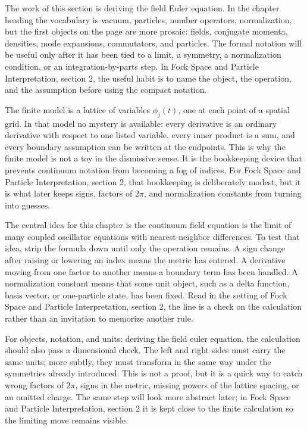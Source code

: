 The work of this section is deriving the field Euler equation.  In the chapter heading the vocabulary is vacuum, particles, number operators, normalization, but the first objects on the page are more prosaic: fields, conjugate momenta, densities, mode expansions, commutators, and particles.  The formal notation will be useful only after it has been tied to a limit, a symmetry, a normalization condition, or an integration-by-parts step.  In Fock Space and Particle Interpretation, section 2, the useful habit is to name the object, the operation, and the assumption before using the compact notation.

The finite model is a lattice of variables \(\phi_j(t)\), one at each point of a spatial grid.  In that model no mystery is available: every derivative is an ordinary derivative with respect to one listed variable, every inner product is a sum, and every boundary assumption can be written at the endpoints.  This is why the finite model is not a toy in the dismissive sense.  It is the bookkeeping device that prevents continuum notation from becoming a fog of indices.  For Fock Space and Particle Interpretation, section 2, that bookkeeping is deliberately modest, but it is what later keeps signs, factors of \(2\pi\), and normalization constants from turning into guesses.

The central idea for this chapter is the continuum field equation is the limit of many coupled oscillator equations with nearest-neighbor differences.  To test that idea, strip the formula down until only the operation remains.  A sign change after raising or lowering an index means the metric has entered.  A derivative moving from one factor to another means a boundary term has been handled.  A normalization constant means that some unit object, such as a delta function, basis vector, or one-particle state, has been fixed.  Read in the setting of Fock Space and Particle Interpretation, section 2, the line is a check on the calculation rather than an invitation to memorize another rule.

For objects, notation, and units: deriving the field euler equation, the calculation should also pass a dimensional check.  The left and right sides must carry the same units; more subtly, they must transform in the same way under the symmetries already introduced.  This is not a proof, but it is a quick way to catch wrong factors of \(2\pi\), signs in the metric, missing powers of the lattice spacing, or an omitted charge.  The same step will look more abstract later; in Fock Space and Particle Interpretation, section 2 it is kept close to the finite calculation so the limiting move remains visible.

